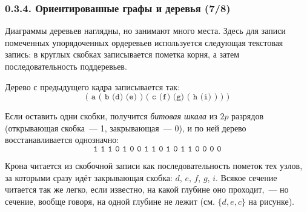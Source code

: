\documentclass[mathserif,12pt,aspectratio=169]{beamer}
\def\emразделенной{\em разделенной}
\def\em#1{\it\color{blue}#1}
\begin{document}
\begin{frame}
\frametitle{0.3.4. Ориентированные графы и деревья (7/8)}

Диаграммы деревьев наглядны, но занимают много места. Здесь для записи помеченных
упорядоченных ордеревьев используется следующая текстовая запись: в круглых
скобках записывается пометка корня, а затем последовательность поддеревьев.

\begin{example}
Дерево с предыдущего кадра записывается так:
\vspace{-8pt}
$$\texttt{( a ( b (d) (e) ) ( c (f) (g) ( h (i) ) ) )}$$
\vspace{-20pt}

Если оставить одни скобки, получится {\em битовая шкала} из $2p$ разрядов
(открывающая скобка~--- 1, закрывающая~--- 0), и по ней дерево восстанавливается
однозначно:
\vspace{-8pt}
$$\texttt{1 1 1 0 1 0 0 1 1 0 1 0 1 1 0 0 0 0}$$
\end{example}
\vspace{-14pt}

\begin{remark}
Крона читается из скобочной записи как последовательность пометок тех узлов, за
которыми сразу идёт закрывающая скобка: $d$, $e$, $f$, $g$, $i$. Всякое сечение
читается так же легко, если известно, на какой глубине оно проходит,~--- но
сечение, вообще говоря, на одной глубине не лежит (см. $\{d,e,c\}$ на рисунке).
\end{remark}
\end{frame}
\end{document}
